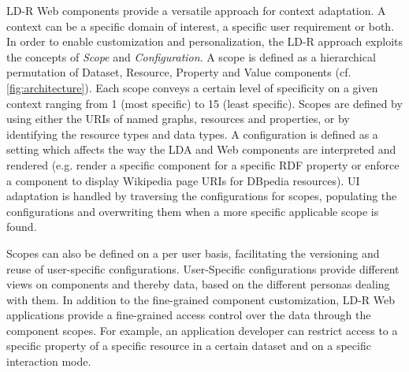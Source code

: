 \documentclass{llncs}
\begin{document}
LD-R Web components provide a versatile approach for context adaptation.
A context can be a specific domain of interest, a specific user requirement or both.
In order to enable customization and personalization, the LD-R approach exploits the concepts of \emph{Scope} and \emph{Configuration}.
A scope is defined as a hierarchical permutation of Dataset, Resource, Property and Value components (cf. \autoref{fig:architecture}).
Each scope conveys a certain level of specificity on a given context ranging from 1 (most specific) to 15 (least specific).
Scopes are defined by using either the URIs of named graphs, resources and properties, or by identifying the resource types and data types.
A configuration is defined as a setting which affects the way the LDA and Web components are interpreted and rendered (e.g. render a specific component for a specific RDF property or enforce a component to display Wikipedia page URIs for DBpedia resources).
UI adaptation is handled by traversing the configurations for scopes, populating the configurations and overwriting them when a more specific applicable scope is found.



Scopes can also be defined on a per user basis, facilitating the versioning and reuse of user-specific configurations.
User-Specific configurations provide different views on components and thereby data, based on the different personas dealing with them.
In addition to the fine-grained component customization, LD-R Web applications provide a fine-grained access control over the data through the component scopes.
For example, an application developer can restrict access to a specific property of a specific resource in a certain dataset and on a specific interaction mode.
\end{document}
